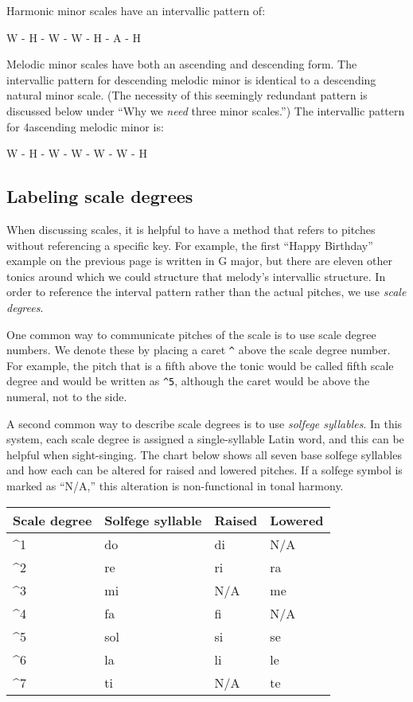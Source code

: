 \documentclass{book}
\begin{document}
Harmonic minor scales have an intervallic pattern of:

W - H - W - W - H - A - H

Melodic minor scales have both an ascending and descending form. The
intervallic pattern for descending melodic minor is identical to a descending
natural minor scale. (The necessity of this seemingly redundant pattern is
discussed below under ``Why we \emph{need} three minor scales.'') The
intervallic pattern for 4ascending melodic minor is:

W - H - W - W - W - W - H

\hypertarget{labeling-scale-degrees}{%
\subsection{Labeling scale degrees}\label{labeling-scale-degrees}}

When discussing scales, it is helpful to have a method that refers to pitches
without referencing a specific key. For example, the first ``Happy Birthday''
example on the previous page is written in G major, but there are eleven other
tonics around which we could structure that melody's intervallic structure. In
order to reference the interval pattern rather than the actual pitches, we use
\emph{scale degrees}.

One common way to communicate pitches of the scale is to use scale degree
numbers. We denote these by placing a caret \texttt{\^{}} above the scale
degree number. For example, the pitch that is a fifth above the tonic would be
called fifth scale degree and would be written as \texttt{\^{}5}, although the
caret would be above the numeral, not to the side.

A second common way to describe scale degrees is to use \emph{solfege
syllables}. In this system, each scale degree is assigned a single-syllable
Latin word, and this can be helpful when sight-singing. The chart below shows
all seven base solfege syllables and how each can be altered for raised and
lowered pitches. If a solfege symbol is marked as ``N/A,'' this alteration is
non-functional in tonal harmony.

\begin{longtable}[]{@{}llll@{}}
\toprule
Scale degree & Solfege syllable & Raised & Lowered \\
\midrule
\endhead
\^{}1 & do & di & N/A \\
\^{}2 & re & ri & ra \\
\^{}3 & mi & N/A & me \\
\^{}4 & fa & fi & N/A \\
\^{}5 & sol & si & se \\
\^{}6 & la & li & le \\
\^{}7 & ti & N/A & te \\
\bottomrule
\end{longtable}
\end{document}
